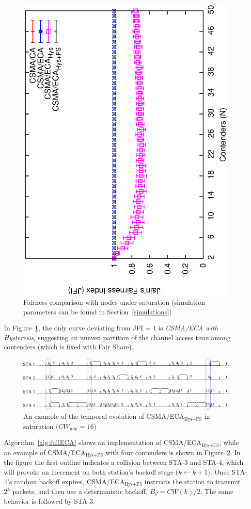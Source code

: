 \documentclass[a4paper,journal]{IEEEtran}
\begin{document}
	\begin{figure}[tb]
	\centering
		\includegraphics[width=0.7\linewidth, angle=-90]{figures/fairness-combined/fairness-combined.eps}
		\caption{Fairness comparison with nodes under saturation (simulation parameters can be found in Section~\ref{simulations})}
		\label{fig:fairness}
	\end{figure}
	
	In Figure~\ref{fig:fairness}, the only curve deviating from JFI = 1 is \emph{CSMA/ECA with Hysteresis}, suggesting an uneven partition of the channel access time among contenders (which is fixed with Fair Share).
	
	\begin{figure}[tb]
	\centering
		\includegraphics[width=0.8\linewidth]{figures/csma_eca_different_backoff_short.eps}
		\caption{An example of the temporal evolution of CSMA/ECA$_{\text{Hys+FS}}$ in saturation ($CW_{\min}=16$)}
		\label{fig:ECA+Hyst}
	\end{figure}
	
	Algorithm~\ref{alg:fullECA} shows an implementation of CSMA/ECA$_{\text{Hys+FS}}$, while an example of CSMA/ECA$_{\text{Hys+FS}}$ with four contenders is shown in  Figure~\ref{fig:ECA+Hyst}. In the figure the first outline indicates a collision between STA-3 and STA-4, which will provoke an increment on both station's backoff stage ($k\leftarrow k+1$). Once STA-4's random backoff expires, CSMA/ECA$_{\text{Hys+FS}}$ instructs the station to transmit $2^{k}$ packets, and then use a deterministic backoff, $B_{d}=CW(k)/2$. The same behavior is followed by STA 3.
	
\end{document}
